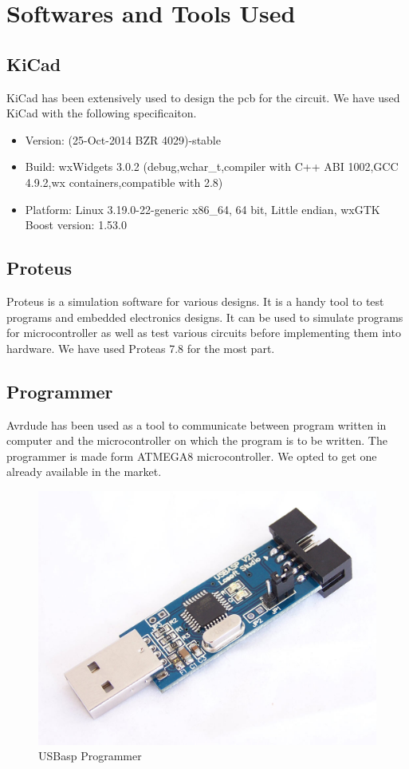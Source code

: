 \section{Softwares and Tools Used}

\subsection{KiCad}
KiCad has been extensively used to design the \gls{pcb} for the circuit. We have used KiCad with the following specificaiton.
\begin{itemize}
\item[~]Version: (25-Oct-2014 BZR 4029)-stable
\item[~]Build: wxWidgets 3.0.2 (debug,wchar\_t,compiler with C++ ABI 1002,GCC 4.9.2,wx containers,compatible with 2.8)
\item[~]Platform: Linux 3.19.0-22-generic x86\_64, 64 bit, Little endian, wxGTK
Boost version: 1.53.0
\end{itemize}

\subsection{Proteus}
Proteus is a simulation software for various designs. It is a handy tool to test programs and embedded electronics designs. It can be used to simulate programs for microcontroller as well as  test various circuits before implementing them into hardware. We have used Proteas 7.8 for the most part.

\subsection{Programmer}
Avrdude has been used as a tool to communicate between program written in computer and the microcontroller on which the program is to be written. The programmer is made form ATMEGA8 microcontroller. We opted to get one already available in the market.
\begin{figure}[h]
	\centering
	\includegraphics[scale=0.18]{Images/Programmer.jpg}
	\caption{USBasp Programmer}
	\label{fig:Programmer}
\end{figure}



